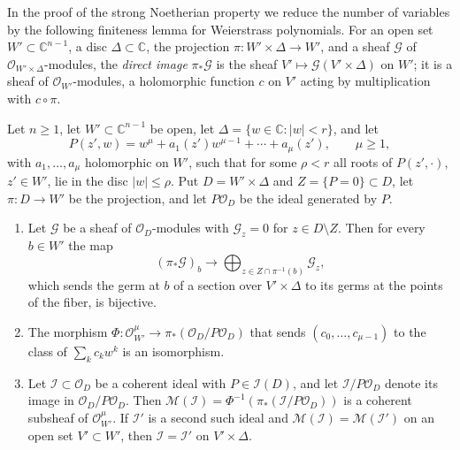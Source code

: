 In the proof of the strong Noetherian property we reduce the number of variables by the following finiteness lemma for Weierstrass polynomials. For an open set $W'\subset\mathbb C^{n-1}$, a disc $\Delta\subset\mathbb C$, the projection $\pi\colon W'\times\Delta\to W'$, and a sheaf $\mathcal G$ of $\mathcal O_{W'\times\Delta}$-modules, the \emph{direct image} $\pi_*\mathcal G$ is the sheaf $V'\mapsto\mathcal G(V'\times\Delta)$ on $W'$; it is a sheaf of $\mathcal O_{W'}$-modules, a holomorphic function $c$ on $V'$ acting by multiplication with $c\circ\pi$.

\begin{lemma}\label{lem:weierstrass-finite-projection}
Let $n\geq1$, let $W'\subset\mathbb C^{n-1}$ be open, let $\Delta=\{w\in\mathbb C:|w|<r\}$, and let
\[
 P(z',w)=w^\mu+a_1(z')w^{\mu-1}+\cdots+a_\mu(z'),\qquad\mu\geq1,
\]
with $a_1,\ldots,a_\mu$ holomorphic on $W'$, such that for some $\rho<r$ all roots of $P(z',\cdot)$, $z'\in W'$, lie in the disc $|w|\leq\rho$. Put $D=W'\times\Delta$ and $Z=\{P=0\}\subset D$, let $\pi\colon D\to W'$ be the projection, and let $P\mathcal O_D$ be the ideal generated by $P$.
\begin{enumerate}
\item Let $\mathcal G$ be a sheaf of $\mathcal O_D$-modules with $\mathcal G_z=0$ for $z\in D\setminus Z$. Then for every $b\in W'$ the map
\[
 (\pi_*\mathcal G)_b\to\bigoplus_{z\in Z\cap\pi^{-1}(b)}\mathcal G_z,
\]
which sends the germ at $b$ of a section over $V'\times\Delta$ to its germs at the points of the fiber, is bijective.
\item The morphism $\Phi\colon\mathcal O_{W'}^\mu\to\pi_*(\mathcal O_D/P\mathcal O_D)$ that sends $(c_0,\ldots,c_{\mu-1})$ to the class of $\sum_kc_kw^k$ is an isomorphism.
\item Let $\mathcal I\subset\mathcal O_D$ be a coherent ideal with $P\in\mathcal I(D)$, and let $\mathcal I/P\mathcal O_D$ denote its image in $\mathcal O_D/P\mathcal O_D$. Then $\mathcal M(\mathcal I)=\Phi^{-1}(\pi_*(\mathcal I/P\mathcal O_D))$ is a coherent subsheaf of $\mathcal O_{W'}^\mu$. If $\mathcal I'$ is a second such ideal and $\mathcal M(\mathcal I)=\mathcal M(\mathcal I')$ on an open set $V'\subset W'$, then $\mathcal I=\mathcal I'$ on $V'\times\Delta$.
\end{enumerate}
\end{lemma}
